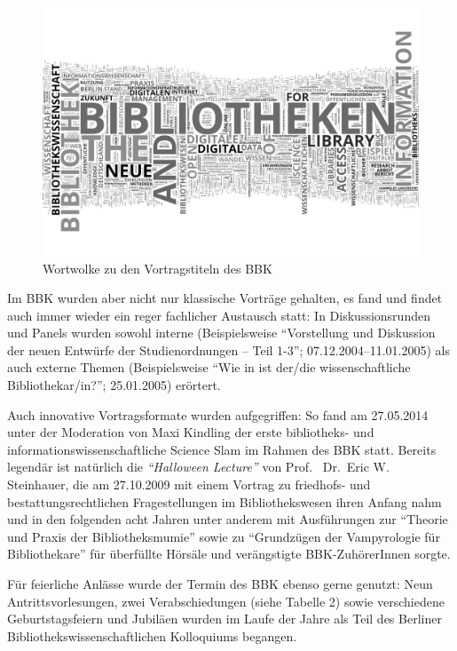 \documentclass[a4paper,
fontsize=11pt,
oneside,
numbers=noperiodatend,
parskip=half-,
bibliography=totoc,
final
]{scrartcl}
\begin{document}
\begin{figure}
\centering
\includegraphics[width=15cm]{img/Abbildung8.png}
\caption{Wortwolke zu den Vortragstiteln des BBK}
\end{figure}

Im BBK wurden aber nicht nur klassische Vorträge gehalten, es fand und
findet auch immer wieder ein reger fachlicher Austausch statt: In
Diskussionsrunden und Panels wurden sowohl interne (Beispielsweise
\enquote{Vorstellung und Diskussion der neuen Entwürfe der
Studienordnungen -- Teil 1-3}; 07.12.2004--11.01.2005) als auch externe
Themen (Beispielsweise \enquote{Wie \glq in \grq ist der/die wissenschaftliche
Bibliothekar/in?}; 25.01.2005) erörtert.

Auch innovative Vortragsformate wurden aufgegriffen: So fand am
27.05.2014 unter der Moderation von Maxi Kindling der erste bibliotheks-
und informationswissenschaftliche Science Slam im Rahmen des BBK statt.
Bereits legendär ist natürlich die \emph{\enquote{Halloween Lecture}}
von Prof.~ Dr.~Eric W. Steinhauer, die am 27.10.2009 mit einem Vortrag
zu friedhofs- und bestattungsrechtlichen Fragestellungen im
Bibliothekswesen ihren Anfang nahm und in den folgenden acht Jahren
unter anderem mit Ausführungen zur \enquote{Theorie und Praxis der
Bibliotheksmumie} sowie zu \enquote{Grundzügen der Vampyrologie für
Bibliothekare} für überfüllte Hörsäle und verängstigte BBK-ZuhörerInnen
sorgte.

Für feierliche Anlässe wurde der Termin des BBK ebenso gerne genutzt:
Neun Antrittsvorlesungen, zwei Verabschiedungen (siehe Tabelle 2) sowie
verschiedene Geburtstagsfeiern und Jubiläen wurden im Laufe der Jahre
als Teil des Berliner Bibliothekswissenschaftlichen Kolloquiums
begangen.
\end{document}
